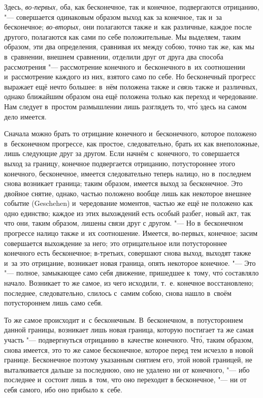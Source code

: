Здесь, {\em во-первых,} оба, как бесконечное, так и
конечное, подвергаются отрицанию, "--- совершается одинаковым образом выход
как за конечное, так и~за бесконечное; {\em во-вторых,}
они полагаются также и~как различные, каждое после другого, полагаются как
сами по себе положительные. Мы выделяем, таким образом, эти два
определения, сравнивая их между собою, точно так же, как мы в~сравнении,
внешнем сравнении, отделили друг от друга два способа рассмотрения
"--- рассмотрение конечного и~бесконечного в~их соотношении и~рассмотрение
каждого из них, взятого само по себе. Но бесконечный прогресс выражает ещё
нечто большее: в~нём положена также и {\em связь} также
и~различных, однако ближайшим образом она ещё положена только как переход и
чередование. Нам следует в~простом размышлении лишь разглядеть то, чт\'{о}
здесь на самом дело имеется.

Сначала можно брать то отрицание конечного и~бесконечного, которое положено
в~бесконечном прогрессе, как простое, следовательно, брать их как
внеположные, лишь следующие друг за другом. Если начнём с~конечного, то
совершается выход за границу, конечное подвергается отрицанию,
потустороннее этого конечного, бесконечное, имеется следовательно теперь
налицо, но в~последнем снова возникает граница; таким образом, имеется
выход за бесконечное. Это двойное снятие, однако, частью положено вообще
лишь как некоторое внешнее событие (Geschehen) и~чередование моментов,
частью же ещё не положено как одно единство; каждое из этих выхождений есть
особый разбег, новый акт, так что они, таким образом, лишены связи друг с
другом. "--- Но в~бесконечном прогрессе налицо также и~их соотношение.
Имеется, во-первых, конечное; засим совершается выхождение за него; это
отрицательное или потустороннее конечного есть бесконечное; в-третьих,
совершают снова выход, выходят также и~за это отрицание, возникает новая
граница, опять некоторое конечное. "--- Это "--- полное, замыкающее само себя
движение, пришедшее к~тому, чт\'{о} составляло начало. Возникает то же самое,
из чего исходили, т.~е. конечное восстановлено; последнее, следовательно,
слилось с~самим собою, снова нашло в~своём потустороннем лишь само себя.

То же самое происходит и~с бесконечным. В~бесконечном, в~потустороннем
данной границы, возникает лишь новая граница, которую постигает та же самая
участь "--- подвергнуться отрицанию в~качестве конечного. Чт\'{о}, таким образом,
снова имеется, это то же самое бесконечное, которое перед тем исчезло в
новой границе. Бесконечное поэтому указанным снятием его, этой новой
границей, не выталкивается дальше за последнюю, оно не удалено ни от
конечного, "--- ибо последнее и~состоит лишь в~том, что оно переходит в
бесконечное, "--- ни от себя самого, ибо оно прибыло к~себе.

